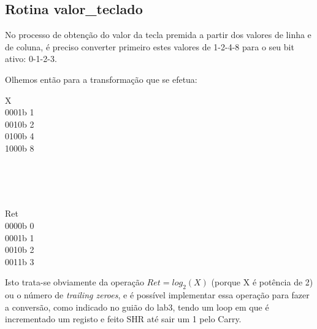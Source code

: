 \documentclass{article}
\begin{document}
\subsection{Rotina valor\_teclado}
No processo de obtenção do valor da tecla premida a partir dos valores de linha e de coluna, é preciso converter primeiro estes valores de 1-2-4-8 para o seu bit ativo: 0-1-2-3.

\bigbreak

Olhemos então para a transformação que se efetua:

\begin{center}
    \begin{minipage}{1.5cm}
        \begin{center}
            X \\
            0001b 1 \\
            0010b 2 \\
            0100b 4 \\
            1000b 8
        \end{center}
    \end{minipage}
    \begin{minipage}{0.5cm}
        \begin{center}
            \bigbreak
            \textrightarrow \\
            \textrightarrow \\
            \textrightarrow \\
            \textrightarrow
        \end{center}
    \end{minipage}
    \begin{minipage}{1.5cm}
        \begin{center}
            Ret \\
            0000b 0 \\
            0001b 1 \\
            0010b 2 \\
            0011b 3
        \end{center}
    \end{minipage}
\end{center}

\bigbreak

Isto trata-se obviamente da operação $Ret = log_{2} (X)$ (porque X é potência de 2) ou o número de \textit{trailing zeroes}, e é possível implementar essa operação para fazer a conversão, como indicado no guião do lab3, tendo um loop em que é incrementado um registo e feito SHR até sair um 1 pelo Carry. 
\end{document}
